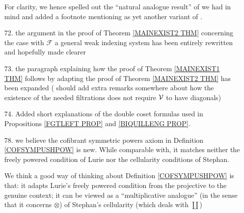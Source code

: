 \documentclass{article}
\begin{document}
\begin{itemize}
        
	For clarity, we hence spelled out the ``natural analogue result'' of \cite[Thm. 11.3.2]{Hi03} we had in mind
	and added a footnote mentioning \cite[Thm. 2]{Spi01} as yet another variant of \cite[Thm. 11.3.2]{Hi03}.
	
	
	
        
	\item[72.] the argument in the proof of Theorem \ref{MAINEXIST2 THM}
	concerning the case with $\mathcal{F}$
	a general weak indexing system has been entirely rewritten and hopefully made clearer
	
	\item[73.] the paragraph explaining how the proof of 
	Theorem \ref{MAINEXIST1 THM}
	follows by adapting the proof of 
	Theorem \ref{MAINEXIST2 THM}
	has been expanded
	({\color{red} should add extra remarks somewhere about how the existence of the needed filtrations does not require $\mathcal V$ to have diagonals})

	\item[74.] Added short explanations of the double coset formulas used in 
	Propositions \ref{FGTLEFT PROP} and \ref{BIQUILLENG PROP}.

	\item[78.]
	we believe the cofibrant symmetric powers axiom in 
	Definition \ref{COFSYMPUSHPOW} is new.
	While comparable with,
	it matches neither the freely powered condition of Lurie nor 
	the cellularity conditions of Stephan.
	
	We think a good way of thinking about 
	Definition \ref{COFSYMPUSHPOW} is that: 
	it adapts Lurie's freely powered condition from the 
	projective to the genuine context;
	it can be viewed as a ``multiplicative analogue''
	(in the sense that it concerns $\otimes$) of 
	Stephan's cellularity (which deals with $\coprod$)
	

\end{itemize}
\end{document}
